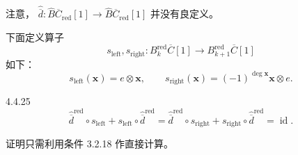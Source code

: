 注意，
$\widehat{\overline d}\colon
\widehat B\overline C_{\mathrm{red}}[1]
\to\widehat B\overline C_{\mathrm{red}}[1]$
并没有良定义。

下面定义算子
\[
 s_{\mathrm{left}},s_{\mathrm{right}}\colon
 B_k^{\mathrm{red}}\overline C[1]
 \longrightarrow B_{k+1}^{\mathrm{red}}\overline C[1]
\]
如下：
\[
 s_{\mathrm{left}}(\mathbf x)=e\otimes\mathbf x,
 \qquad
 s_{\mathrm{right}}(\mathbf x)
 =(-1)^{\deg\mathbf x}\mathbf x\otimes e.
\]

\begin{lemma}{4.4.25}\label{lem:4-4-25}
\[
 \widehat{\overline d}^{\mathrm{red}}\circ s_{\mathrm{left}}
 +s_{\mathrm{left}}\circ\widehat{\overline d}^{\mathrm{red}}
 =
 \widehat{\overline d}^{\mathrm{red}}\circ s_{\mathrm{right}}
 +s_{\mathrm{right}}\circ\widehat{\overline d}^{\mathrm{red}}
 =\operatorname{id}.
\]
\end{lemma}

证明只需利用条件 3.2.18 作直接计算。

